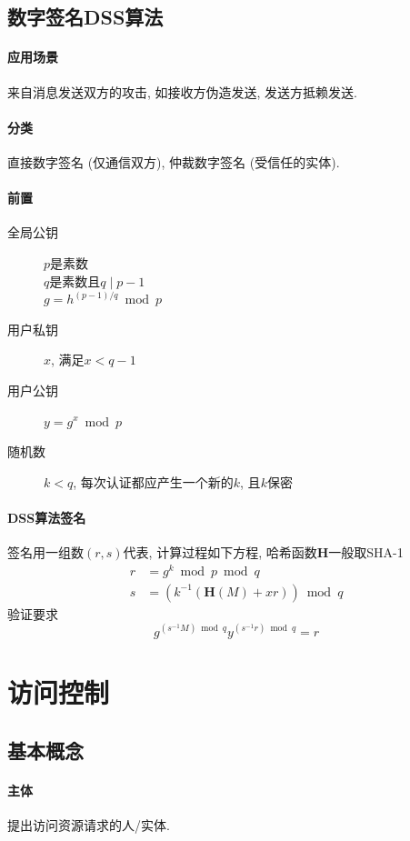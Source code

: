 \documentclass{ctexart}
\begin{document}
\subsection{数字签名DSS算法}
\paragraph{应用场景} 来自消息发送双方的攻击, 如接收方伪造发送, 发送方抵赖发送.
\paragraph{分类} 直接数字签名 (仅通信双方), 仲裁数字签名 (受信任的实体).
\paragraph{前置} \begin{description}
    \item[全局公钥] $p$是素数\\ $q$是素数且$q \mid p -1$\\
        $g = h^{(p-1) / q} \bmod p$
    \item[用户私钥] $x$, 满足$x < q-1$
    \item[用户公钥] $y = g^x \bmod p$
    \item[随机数] $k < q$, 每次认证都应产生一个新的$k$, 且$k$保密
    \end{description}
\paragraph{DSS算法签名} 签名用一组数$(r, s)$代表, 计算过程如下方程, 哈希函数$\mathbf{H}$一般取SHA-1
    \begin{align*}
        r &= g^k \bmod p \bmod q\\
        s &= (k^{-1} (\mathbf{H}(M) + xr)) \bmod q
    \end{align*}验证要求 \begin{equation*}
        g^{(s^{-1} M) \bmod q} y^{(s^{-1} r) \bmod q} = r
    \end{equation*}

\section{访问控制}
\subsection{基本概念}
\paragraph{主体} 提出访问资源请求的人/实体.
\end{document}
